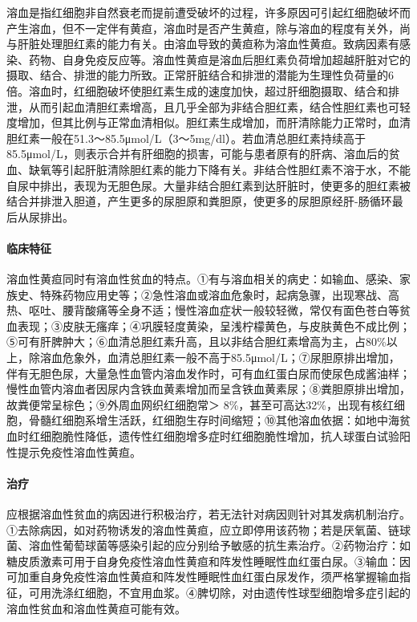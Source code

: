 溶血是指红细胞非自然衰老而提前遭受破坏的过程，许多原因可引起红细胞破坏而产生溶血，但不一定伴有黄疸，溶血时是否产生黄疸，除与溶血的程度有关外，尚与肝脏处理胆红素的能力有关。由溶血导致的黄疸称为溶血性黄疸。致病因素有感染、药物、自身免疫反应等。溶血性黄疸是溶血后胆红素负荷增加超越肝脏对它的摄取、结合、排泄的能力所致。正常肝脏结合和排泄的潜能为生理性负荷量的6倍。溶血时，红细胞破坏使胆红素生成的速度加快，超过肝细胞摄取、结合和排泄，从而引起血清胆红素增高，且几乎全部为非结合胆红素，结合性胆红素也可轻度增加，但其比例与正常血清相似。胆红素生成增加，而肝清除能力正常时，血清胆红素一般在51.3～85.5μmol/L（3～5mg/dl）。若血清总胆红素持续高于85.5μmol/L，则表示合并有肝细胞的损害，可能与患者原有的肝病、溶血后的贫血、缺氧等引起肝脏清除胆红素的能力下降有关。非结合性胆红素不溶于水，不能自尿中排出，表现为无胆色尿。大量非结合胆红素到达肝脏时，使更多的胆红素被结合并排泄入胆道，产生更多的尿胆原和粪胆原，使更多的尿胆原经肝-肠循环最后从尿排出。

\paragraph{临床特征}

溶血性黄疸同时有溶血性贫血的特点。①有与溶血相关的病史：如输血、感染、家族史、特殊药物应用史等；②急性溶血或溶血危象时，起病急骤，出现寒战、高热、呕吐、腰背酸痛等全身不适；慢性溶血症状一般较轻微，常仅有面色苍白等贫血表现；③皮肤无瘙痒；④巩膜轻度黄染，呈浅柠檬黄色，与皮肤黄色不成比例；⑤可有肝脾肿大；⑥血清总胆红素升高，且以非结合胆红素增高为主，占80\%以上，除溶血危象外，血清总胆红素一般不高于85.5μmol/L；⑦尿胆原排出增加，伴有无胆色尿，大量急性血管内溶血发作时，可有血红蛋白尿而使尿色成酱油样；慢性血管内溶血者因尿内含铁血黄素增加而呈含铁血黄素尿；⑧粪胆原排出增加，故粪便常呈棕色；⑨外周血网织红细胞常＞
8\%，甚至可高达32\%，出现有核红细胞，骨髓红细胞系增生活跃，红细胞生存时间缩短；⑩其他溶血依据：如地中海贫血时红细胞脆性降低，遗传性红细胞增多症时红细胞脆性增加，抗人球蛋白试验阳性提示免疫性溶血性黄疸。

\paragraph{治疗}

应根据溶血性贫血的病因进行积极治疗，若无法针对病因则针对其发病机制治疗。①去除病因，如对药物诱发的溶血性黄疸，应立即停用该药物；若是厌氧菌、链球菌、溶血性葡萄球菌等感染引起的应分别给予敏感的抗生素治疗。②药物治疗：如糖皮质激素可用于自身免疫性溶血性黄疸和阵发性睡眠性血红蛋白尿。③输血：因可加重自身免疫性溶血性黄疸和阵发性睡眠性血红蛋白尿发作，须严格掌握输血指征，可用洗涤红细胞，不宜用血浆。④脾切除，对由遗传性球型细胞增多症引起的溶血性贫血和溶血性黄疸可能有效。

